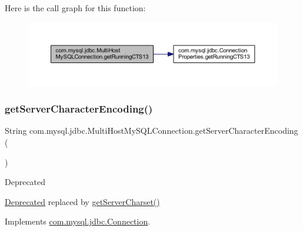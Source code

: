 Here is the call graph for this function\+:
\nopagebreak
\begin{figure}[H]
\begin{center}
\leavevmode
\includegraphics[width=350pt]{classcom_1_1mysql_1_1jdbc_1_1_multi_host_my_s_q_l_connection_a560585155115e4a2a82356fffe5fc672_cgraph}
\end{center}
\end{figure}
\mbox{\label{classcom_1_1mysql_1_1jdbc_1_1_multi_host_my_s_q_l_connection_a940e7c80b671d477225bb90a97dd0f78}} 
\subsubsection{\texorpdfstring{get\+Server\+Character\+Encoding()}{getServerCharacterEncoding()}}
{\footnotesize\ttfamily String com.\+mysql.\+jdbc.\+Multi\+Host\+My\+S\+Q\+L\+Connection.\+get\+Server\+Character\+Encoding (\begin{DoxyParamCaption}{ }\end{DoxyParamCaption})}

\begin{DoxyRefDesc}{Deprecated}
\item[\mbox{\hyperlink{deprecated__deprecated000014}{Deprecated}}]replaced by {\ttfamily \mbox{\hyperlink{classcom_1_1mysql_1_1jdbc_1_1_multi_host_my_s_q_l_connection_ade6eec72969b91ca518b7750d0af4539}{get\+Server\+Charset()}}} \end{DoxyRefDesc}


Implements \mbox{\hyperlink{interfacecom_1_1mysql_1_1jdbc_1_1_connection_ab6e0170645e189b8622642705f7cc3a4}{com.\+mysql.\+jdbc.\+Connection}}.

